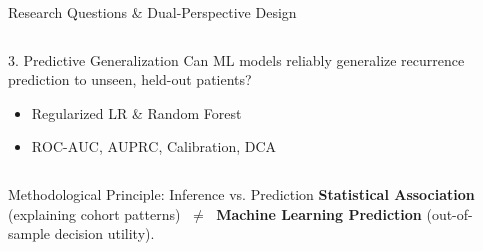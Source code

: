 \documentclass[10pt,aspectratio=169,xcolor={table,dvipsnames}]{beamer}
\newcommand{\ROC}{\text{ROC-AUC}}
\newcommand{\AUPRC}{\text{AUPRC}}
\begin{document}
\begin{frame}{Research Questions \& Dual-Perspective Design}
\begin{columns}[t]
      \begin{block}{\centering \small 3. Predictive Generalization}
        \vspace{0.1cm}
        {\scriptsize Can ML models reliably generalize recurrence prediction to unseen, held-out patients?}
        \begin{itemize}\setlength{\itemsep}{0pt}
          \item {\tiny Regularized LR \& Random Forest}
          \item {\tiny $\ROC$, $\AUPRC$, Calibration, DCA}
        \end{itemize}
      \end{block}
  \end{columns}

  \vspace{0.25cm}
  \begin{exampleblock}{Methodological Principle: Inference vs. Prediction}
    \centering \small
    \textbf{Statistical Association} (explaining cohort patterns) $\;\neq\;$ \textbf{Machine Learning Prediction} (out-of-sample decision utility).
  \end{exampleblock}
\end{frame}
\end{document}
